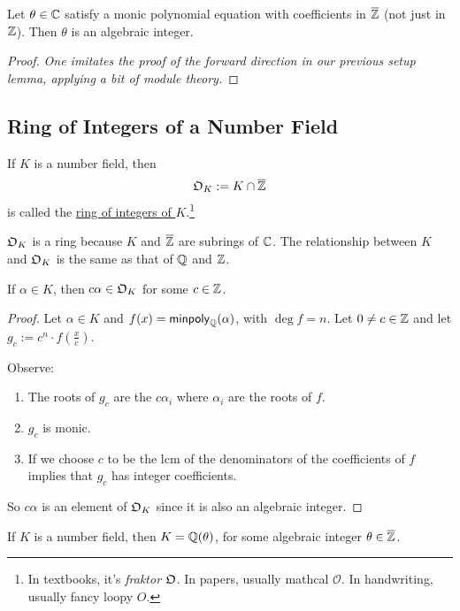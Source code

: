\begin{theorem}
    Let $\theta\in\mathbb C$ satisfy a monic polynomial equation with coefficients in $\overline{\mathbb Z}$ (not just in $\mathbb Z$). Then $\theta$ is an algebraic integer.
\end{theorem}
\begin{proof}
    \emph{One imitates the proof of the forward direction in our previous setup lemma, applying a bit of module theory.}
\end{proof}

\subsection{Ring of Integers of a Number Field}
\begin{definition}
    If $K$ is a number field, then
    \[\mathfrak{O}_K := K\cap \overline{\mathbb Z}\]
    is called the \ul{ring of integers of $K$}.\footnote{In textbooks, it's \emph{fraktor} $\mathfrak{O}$. In papers, usually mathcal $\mathcal{O}$. In handwriting, usually fancy loopy $O$.}
\end{definition}
$\mathfrak{O}_K$ is a ring because $K$ and $\overline{\mathbb Z}$ are subrings of $\mathbb C$. The relationship between $K$ and $\mathfrak{O}_K$ is the same as that of $\mathbb Q$ and $\mathbb Z$.

\begin{lemma}
    If $\alpha\in K$, then $c\alpha\in \mathfrak{O}_K$ for some $c\in\mathbb Z$.
\end{lemma}
\begin{proof}
    Let $\alpha\in K$ and $f(x) = \operatorname{\mathsf{minpoly}}_\mathbb Q(\alpha)$, with $\deg f = n$. Let $0\neq c\in \mathbb Z$ and let $g_c := c^n\cdot f\left( \frac{x}{c} \right)$.

    Observe:
    \begin{enumerate}[1)]
        \item The roots of $g_c$ are the $c\alpha_i$ where $\alpha_i$ are the roots of $f$.
        \item $g_c$ is monic.
        \item If we choose $c$ to be the lcm of the denominators of the coefficients of $f$ implies that $g_c$ has integer coefficients.
    \end{enumerate}
    So $c\alpha$ is an element of $\mathfrak{O}_K$ since it is also an algebraic integer.
\end{proof}

\begin{corollary}
    If $K$ is a number field, then $K = \mathbb Q(\theta)$, for some algebraic integer $\theta\in\overline{\mathbb Z}$.
\end{corollary}

